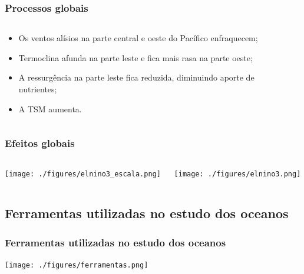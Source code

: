 \documentclass[14pt,xcolor=dvipsnames]{beamer}
\begin{document}
\begin{frame}
    \frametitle{Processos globais}
    \begin{columns}
        \begin{column}{0.5\textwidth}
            \begin{itemize}[<+-| alert@+>]
                \item Os ventos alísios na parte central e oeste do Pacífico
                      enfraquecem;
                \item Termoclina afunda na parte leste e fica mais rasa na
                      parte oeste;
                \item A ressurgência na parte leste fica reduzida, diminuindo
                      aporte de nutrientes;
                \item A TSM aumenta.
    \end{itemize}
        \end{column}
        \begin{column}{0.3\textwidth}
            \centerline{}
            \centerline{}
        \end{column}
    \end{columns}
\end{frame}

\begin{frame}
    \frametitle{Efeitos globais}
    \begin{columns}
        \begin{column}{0.3\textwidth}
            \centerline{\texttt{[image: ./figures/elnino3\_escala.png]}}
        \end{column}
        \begin{column}{0.7\textwidth}
            \centerline{\texttt{[image: ./figures/elnino3.png]}}
        \end{column}
    \end{columns}
\end{frame}

\subsection{Ferramentas utilizadas no estudo dos oceanos}
\begin{frame}
    \frametitle{Ferramentas utilizadas no estudo dos oceanos}
    \centerline{\texttt{[image: ./figures/ferramentas.png]}}
\end{frame}
\end{document}
